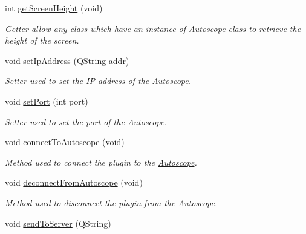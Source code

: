 \begin{DoxyCompactItemize}
int \hyperlink{class_autoscope_adb579d1e5a23aaa401d5a93be033529d}{get\+Screen\+Height} (void)
\begin{DoxyCompactList}\small\item\em Getter allow any class which have an instance of \hyperlink{class_autoscope}{Autoscope} class to retrieve the height of the screen. \end{DoxyCompactList}\item 
void \hyperlink{class_autoscope_aad5b62b7a114ef8755923067e14f9dd8}{set\+Ip\+Address} (Q\+String addr)
\begin{DoxyCompactList}\small\item\em Setter used to set the IP address of the \hyperlink{class_autoscope}{Autoscope}. \end{DoxyCompactList}\item 
void \hyperlink{class_autoscope_acda88ddee4fb3fbd0333717c0f140e54}{set\+Port} (int port)
\begin{DoxyCompactList}\small\item\em Setter used to set the port of the \hyperlink{class_autoscope}{Autoscope}. \end{DoxyCompactList}\item 
void \hyperlink{class_autoscope_a1ae78f4cada1c4e36f5a06db126017fe}{connect\+To\+Autoscope} (void)
\begin{DoxyCompactList}\small\item\em Method used to connect the plugin to the \hyperlink{class_autoscope}{Autoscope}. \end{DoxyCompactList}\item 
void \hyperlink{class_autoscope_aafe64e11135903a1b83d16ffdd07d63e}{deconnect\+From\+Autoscope} (void)
\begin{DoxyCompactList}\small\item\em Method used to disconnect the plugin from the \hyperlink{class_autoscope}{Autoscope}. \end{DoxyCompactList}\item 
void \hyperlink{class_autoscope_a724178eb130dde22dc564a086b82c0e4}{send\+To\+Server} (Q\+String)
\end{DoxyCompactItemize}
